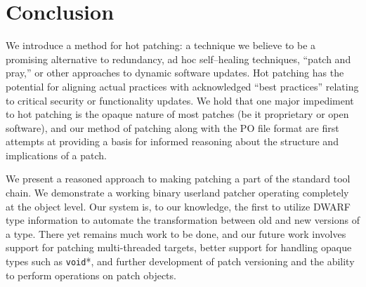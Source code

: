 \section{Conclusion}
\label{sec:conclusion}

We introduce a method for hot patching: a technique we believe to be a
promising alternative to redundancy, ad hoc self--healing techniques,
``patch and pray,'' or other approaches to dynamic software updates.
Hot patching has the potential for aligning actual practices with
acknowledged ``best practices'' relating to critical security or 
functionality updates.  We hold that one major impediment to hot
patching is the opaque nature of most patches (be it
proprietary or open software), and our method of patching along with the
PO file format are first attempts at providing a basis for informed reasoning
about the structure and implications of a patch. 

We present a reasoned approach to making patching a part of the
standard tool chain. We demonstrate a working binary userland patcher
operating completely at the object level. Our system is, to our
knowledge, the first to utilize DWARF type information to automate the
transformation between old and new versions of a type. There yet
remains much work to be done, and our future work involves support for
patching multi-threaded targets, better support for handling opaque
types such as \texttt{void}*, and further development of patch
versioning and the ability to perform operations on patch objects.
